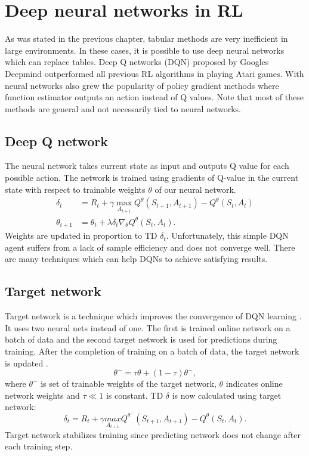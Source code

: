\section{Deep neural networks in RL}
As was stated in the previous chapter, tabular methods are very inefficient in large environments. In these cases, it is possible to use deep neural networks which can replace tables. Deep Q networks (DQN) proposed by Googles Deepmind \cite{mnih2015} outperformed all previous RL algorithms in playing Atari games. With neural networks also grew the popularity of policy gradient methods where function estimator outputs an action instead of Q values. Note that most of these methods are general and not necessarily tied to neural networks.

\subsection{Deep Q network}
The neural network takes current state as input and outputs Q value for each possible action. The network is trained using gradients of Q-value in the current state with respect to trainable weights $\theta$ of our neural network.
\begin{align} \label{eq:qlearn}
\delta_t &= R_{t} + \gamma \underset{A_{t+1}}{\max}Q^\theta(S_{t+1}, A_{t+1}) - Q^\theta(S_t, A_t)\\
\theta_{t+1} &= \theta_t + \lambda \delta_t \nabla_\theta Q^\theta (S_t, A_t).
\end{align}
Weights are updated in proportion to TD $\delta_t$. Unfortunately, this simple DQN agent suffers from a lack of sample efficiency and does not converge well. There are many techniques which can help DQNs to achieve satisfying results.

\subsection{Target network}
Target network is a technique which improves the convergence of DQN learning \cite{mnih2015}. It uses two neural nets instead of one. The first is trained online network on a batch of data and the second target network is used for predictions during training. After the completion of training on a batch of data, the target network is updated \cite{lilicrap2015}.
\begin{equation}
\theta^- = \tau \theta + (1-\tau)\theta^-,
\end{equation}
where $\theta^-$ is set of trainable weights of the target network, $\theta$ indicates online network weights and $\tau \ll 1$ is constant.
TD $\delta$ is now calculated using target network:
\begin{equation}
\delta_t = R_{t} + \gamma \underset{A_{t+1}}{max}Q^{\theta^-}(S_{t+1}, A_{t+1}) - Q^\theta(S_t, A_t). 
\end{equation}
Target network stabilizes training since predicting network does not change after each training step.

